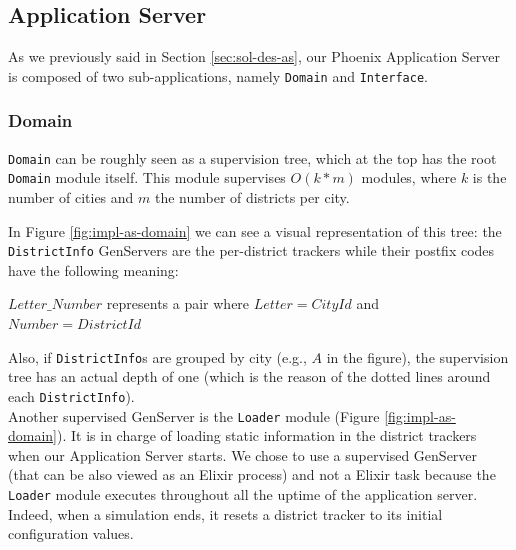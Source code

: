 \subsection{Application Server}\label{sec:impl-as}

As we previously said in Section \ref{sec:sol-des-as}, our Phoenix Application
Server is composed of two sub-applications, namely \texttt{Domain} and
\texttt{Interface}.

\subsubsection{Domain}

\texttt{Domain} can be roughly seen as a supervision tree, which at the top has
the root \texttt{Domain} module itself. This module supervises $O(k * m)$
modules, where $k$ is the number of cities and $m$ the number of districts per
city.

In Figure \ref{fig:impl-as-domain} we can see a visual representation of this
tree: the \texttt{DistrictInfo} GenServers are the
per-district trackers while their postfix codes have the following meaning:
\begin{center}
  $Letter\_Number$ represents a pair where
  $Letter=CityId$ and $Number=DistrictId$
\end{center}

Also, if \texttt{DistrictInfo}s are grouped by city
(e.g., $A$ in the figure), the
supervision tree has an actual depth of one (which is the reason of the
dotted lines around each \texttt{DistrictInfo}).
\\

Another supervised GenServer
is the \texttt{Loader} module (Figure \ref{fig:impl-as-domain}).
It is in charge of
loading static information in
the district trackers when our Application Server starts.
We chose to use a
supervised GenServer (that can be also viewed as an Elixir process) and not a
Elixir task because the \texttt{Loader} module executes throughout all the
uptime of the application server.
Indeed, when a
simulation ends, it resets a district
tracker to its initial
configuration values.

